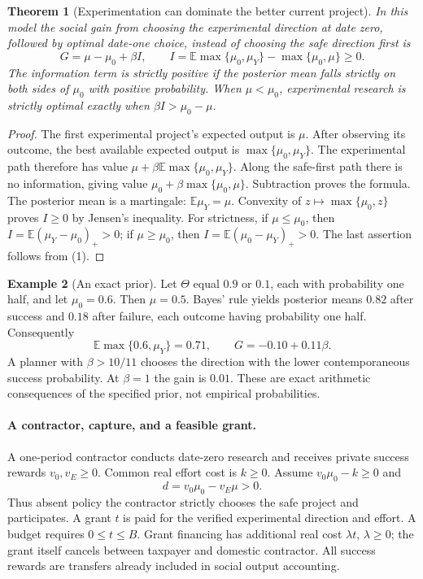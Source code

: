 \documentclass[11pt]{article}
\newtheorem{theorem}{Theorem}
\theoremstyle{definition}
\newtheorem{example}[theorem]{Example}
\begin{document}
\begin{theorem}[Experimentation can dominate the better current project]
In this model the social gain from choosing the experimental direction at date zero, followed by optimal date-one choice, instead of choosing the safe direction first is
\[
 G=\mu-\mu_0+\beta I,\qquad
 I=\mathbb E\max\{\mu_0,\mu_Y\}-\max\{\mu_0,\mu\}\geq0.
 \tag{1}
\]
The information term is strictly positive if the posterior mean falls strictly on both sides of $\mu_0$ with positive probability. When $\mu<\mu_0$, experimental research is strictly optimal exactly when $\beta I>\mu_0-\mu$.
\end{theorem}
\begin{proof}
The first experimental project's expected output is $\mu$. After observing its outcome, the best available expected output is $\max\{\mu_0,\mu_Y\}$. The experimental path therefore has value $\mu+\beta\mathbb E\max\{\mu_0,\mu_Y\}$. Along the safe-first path there is no information, giving value $\mu_0+\beta\max\{\mu_0,\mu\}$. Subtraction proves the formula. The posterior mean is a martingale: $\mathbb E\mu_Y=\mu$. Convexity of $z\mapsto\max\{\mu_0,z\}$ proves $I\geq0$ by Jensen's inequality. For strictness, if $\mu\leq\mu_0$, then $I=\mathbb E(\mu_Y-\mu_0)_+>0$; if $\mu\geq\mu_0$, then $I=\mathbb E(\mu_0-\mu_Y)_+>0$. The last assertion follows from (1).
\end{proof}

\begin{example}[An exact prior]
Let $\Theta$ equal $0.9$ or $0.1$, each with probability one half, and let $\mu_0=0.6$. Then $\mu=0.5$. Bayes' rule yields posterior means $0.82$ after success and $0.18$ after failure, each outcome having probability one half. Consequently
\[
 \mathbb E\max\{0.6,\mu_Y\}=0.71,
 \qquad G=-0.10+0.11\beta.
\]
A planner with $\beta>10/11$ chooses the direction with the lower contemporaneous success probability. At $\beta=1$ the gain is $0.01$. These are exact arithmetic consequences of the specified prior, not empirical probabilities.
\end{example}

\paragraph{A contractor, capture, and a feasible grant.}
A one-period contractor conducts date-zero research and receives private success rewards $v_0,v_E\geq0$. Common real effort cost is $k\geq0$. Assume $v_0\mu_0-k\geq0$ and
\[
 d=v_0\mu_0-v_E\mu>0.
\]
Thus absent policy the contractor strictly chooses the safe project and participates. A grant $t$ is paid for the verified experimental direction and effort. A budget requires $0\leq t\leq B$. Grant financing has additional real cost $\lambda t$, $\lambda\geq0$; the grant itself cancels between taxpayer and domestic contractor. All success rewards are transfers already included in social output accounting.
\end{document}
